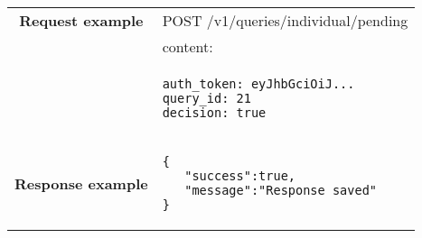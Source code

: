 \begin{adjustwidth}{1cm}{}
\begin{longtable}{|c|l|}
            
                           \textbf{Request example}
             & POST /v1/queries/individual/pending \\
             & content: \\
            & \begin{minipage}[t]{0.5\textwidth}
                \begin{adjustwidth}{1.5cm}{}
                \begin{verbatim}
auth_token: eyJhbGciOiJ...
query_id: 21
decision: true
                \end{verbatim}
                \end{adjustwidth}
              \end{minipage} \\
            \hline
             \textbf{Response example} & 
              \begin{minipage}[t]{0.5\textwidth}
                \begin{adjustwidth}{1.5cm}{}
                \begin{verbatim}
{
   "success":true,
   "message":"Response saved"
}
                \end{verbatim}
                \end{adjustwidth}
              \end{minipage} \\
              \hline
 
 
        \end{longtable}
    \end{adjustwidth}
    
